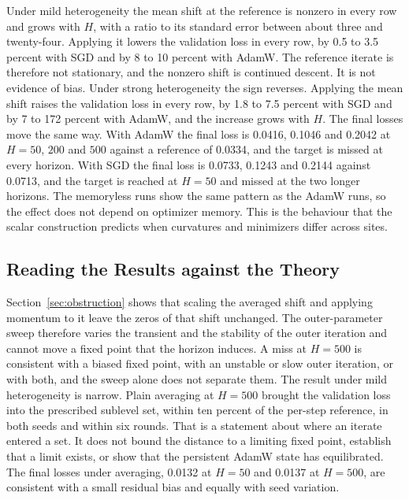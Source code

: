 \documentclass[11pt]{article}
\theoremstyle{definition}
\theoremstyle{remark}
\begin{document}
Under mild heterogeneity the mean shift at the reference is nonzero in every row and grows with $H$, with a ratio to its standard error between about three and twenty-four. Applying it lowers the validation loss in every row, by 0.5 to 3.5 percent with SGD and by 8 to 10 percent with AdamW. The reference iterate is therefore not stationary, and the nonzero shift is continued descent. It is not evidence of bias. Under strong heterogeneity the sign reverses. Applying the mean shift raises the validation loss in every row, by 1.8 to 7.5 percent with SGD and by 7 to 172 percent with AdamW, and the increase grows with $H$. The final losses move the same way. With AdamW the final loss is 0.0416, 0.1046 and 0.2042 at $H=50$, $200$ and $500$ against a reference of 0.0334, and the target is missed at every horizon. With SGD the final loss is 0.0733, 0.1243 and 0.2144 against 0.0713, and the target is reached at $H=50$ and missed at the two longer horizons. The memoryless runs show the same pattern as the AdamW runs, so the effect does not depend on optimizer memory. This is the behaviour that the scalar construction predicts when curvatures and minimizers differ across sites.

\subsection{Reading the Results against the Theory}

Section~\ref{sec:obstruction} shows that scaling the averaged shift and applying momentum to it leave the zeros of that shift unchanged. The outer-parameter sweep therefore varies the transient and the stability of the outer iteration and cannot move a fixed point that the horizon induces. A miss at $H=500$ is consistent with a biased fixed point, with an unstable or slow outer iteration, or with both, and the sweep alone does not separate them. The result under mild heterogeneity is narrow. Plain averaging at $H=500$ brought the validation loss into the prescribed sublevel set, within ten percent of the per-step reference, in both seeds and within six rounds. That is a statement about where an iterate entered a set. It does not bound the distance to a limiting fixed point, establish that a limit exists, or show that the persistent AdamW state has equilibrated. The final losses under averaging, 0.0132 at $H=50$ and 0.0137 at $H=500$, are consistent with a small residual bias and equally with seed variation.
\end{document}
